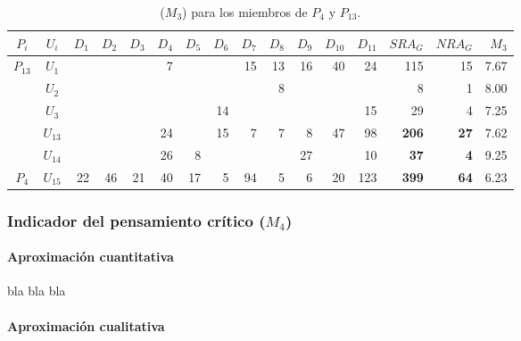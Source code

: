 \begin{table}[h]
\centering
\begin{tabular}{|c|c|r|r|r|r|r|r|r|r|r|r|r|r|r|r|}
\hline
\textbf{$P_i$} & \textbf{$U_i$} & \textbf{$D_1$} & \textbf{$D_2$} & \textbf{$D_3$} & \textbf{$D_4$} & \textbf{$D_5$} & \textbf{$D_6$} & \textbf{$D_7$} & \textbf{$D_8$} & \textbf{$D_9$} & \textbf{$D_{10}$} & \textbf{$D_{11}$} &  \textbf{$SRA_G$ } & \textbf{$NRA_G$ } & \textbf{$M_3$} \\ \hline
\hline
\multirow{3}{*}{$P_{13}$} & $U_1$ &   &   &   & 7 &   &     & 15   & 13  & 16  & 40  & 24 & 115 & 15 & 7.67 \\
 & $U_2$ &   &   &   &    &   &     &      & 8    &      &       &     & 8    & 1   & 8.00 \\
 & $U_3$ &   &   &   &    &   & 14  &     &      &      &       & 15 &  29 & 4   & 7.25  \\ \hline
 & $U_{13}$ &   &   &   & 24 &      & 15  & 7   & 7   & 8   & 47  & 98  & \textbf{206} & \textbf{27} & 7.62 \\ 
 & $U_{14}$ &   &   &   & 26 & 8   &      &      &      &  27 &      & 10 &  \textbf{37}  & \textbf{4} & 9.25 \\ 
\multirow{-3}{*}{$P_{4}$} & $U_{15}$ & 22 &  46 & 21   &  40 & 17  & 5 & 94 &  5   & 6  &  20  &  123 & \textbf{399} & \textbf{64} & 6.23 \\ \hline
\end{tabular}
\caption{($M_3$) para los miembros de $P_{4}$ y $P_{13}$.}
\label{table:project-individual-grades}
\end{table}


\subsubsection{Indicador del pensamiento crítico ($M_4$)}

\paragraph*{Aproximación cuantitativa}

bla bla bla

\paragraph*{Aproximación cualitativa}


